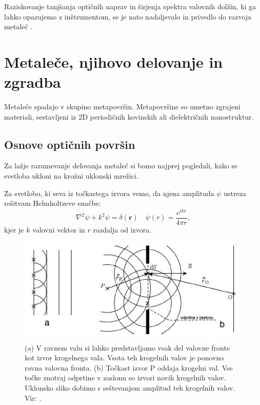 \documentclass[12pt ]{article}
\begin{document}
Raziskovanje tanjšanja optičnih naprav in širjenja spektra valovnih dolžin, ki ga lahko opazujemo z inštrumentom, se je nato nadaljevalo in privedlo do razvoja metaleč \cite{Zgodovina}.
 
 \section{Metaleče, njihovo delovanje in zgradba}
 Metaleče spadajo v skupino metapovršin. Metapovršine so umetno zgrajeni materiali, sestavljeni iz 2D periodičnih kovinskih ali dielektričnih nanostruktur.
 
 
 
 

\subsection{Osnove optičnih površin}
Za lažje razumevanje delovanja metaleč si bomo najprej pogledali, kako se svetloba ukloni na krožni uklonski mrežici. 


Za svetlobo, ki seva iz točkastega izvora vemo, da njena amplituda $\psi$ ustreza rešitvam Helmholtzeve enačbe:
\begin{equation}
\nabla^{2} \psi+k^{2} \psi=\delta(\mathbf{r}) \quad \psi(r)=\frac{e^{ikr}}{4\pi r},
\end{equation}
kjer je $k$ valovni vektor in $r$ razdalja od izvora.
\begin{figure}[H]
    \centering
    \includegraphics{Slike/pRAK.JPG}
    \caption{(a) V ravnem valu si lahko predstavljamo vsak del valovne fronte kot izvor krogelnega vala. Vsota teh krogelnih valov je ponovno ravna valovna fronta. (b) Točkast izvor P oddaja krogelni val. Vse točke znotraj odprtine v zaslonu so izvori novih krogelnih valov. Uklonsko sliko dobimo s seštevanjem amplitud teh krogelnih valov. Vir: \cite{Praktikum4}.}
    \label{Slika uklona}
\end{figure}
\end{document}
